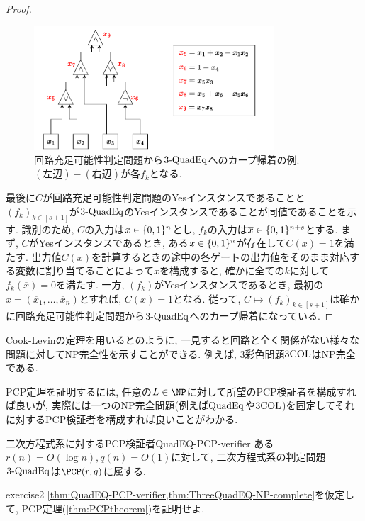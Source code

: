\begin{proof}
  \begin{figure}[ht]
    \centering
    \includegraphics[width=0.8\textwidth]{images/circuit_to_3-QUADEQ.pdf}
    \caption{回路充足可能性判定問題から$\text{3-QuadEq}$へのカープ帰着の例. $(\text{左辺})-(\text{右辺})$が各$f_k$となる. \label{fig:circuit-to-3-QUADEQ}}
  \end{figure}

  最後に$C$が回路充足可能性判定問題のYesインスタンスであることと$(f_k)_{k\in[s+1]}$が$\text{3-QuadEq}$のYesインスタンスであることが同値であることを示す.
  識別のため, $C$の入力は$x\in\{0,1\}^n$とし, $f_k$の入力は$\overline{x} \in \{0,1\}^{n+s}$とする.
  まず, $C$がYesインスタンスであるとき, ある$x\in\{0,1\}^n$が存在して$C(x)=1$を満たす.
  出力値$C(x)$を計算するときの途中の各ゲートの出力値をそのまま対応する変数に割り当てることによって$\overline{x}$を構成すると, 確かに全ての$k$に対して$f_k(\overline{x})=0$を満たす.
  一方, $(f_k)$がYesインスタンスであるとき, 最初の$x=(\overline{x}_1,\dots,\overline{x}_{n})$とすれば, $C(x)=1$となる.
  従って, $C\mapsto (f_k)_{k\in[s+1]}$は確かに回路充足可能性判定問題から$\text{3-QuadEq}$へのカープ帰着になっている.
\end{proof}

Cook-Levinの定理を用いると\cite{Karp1972}のように, 一見すると回路と全く関係がない様々な問題に対してNP完全性を示すことができる.
例えば, 3彩色問題$\text{3COL}$はNP完全である.

PCP定理を証明するには, 任意の$L\in\NP$に対して所望のPCP検証者を構成すれば良いが,
実際には一つのNP完全問題(例えば$\text{QuadEq}$や$\text{3COL}$)を固定してそれに対するPCP検証者を構成すれば良いことがわかる.

\begin{theorem}{二次方程式系に対するPCP検証者}{QuadEQ-PCP-verifier}
  ある$r(n)=O(\log n),q(n)=O(1)$に対して, 二次方程式系の判定問題$\text{3-QuadEq}$は$\PCP(r,q)$に属する.
\end{theorem}

\begin{exercise}{}{exercise2}
  \cref{thm:QuadEQ-PCP-verifier,thm:ThreeQuadEQ-NP-complete}を仮定して, PCP定理(\cref{thm:PCPtheorem})を証明せよ.
\end{exercise}

